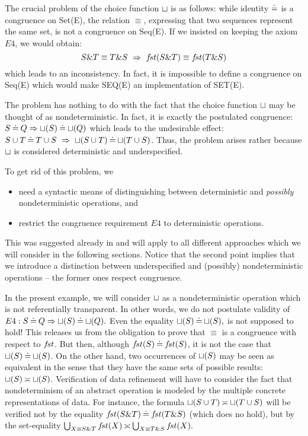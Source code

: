 The crucial problem of the choice function $ \sqcup $ is as follows: while identity $\mathbin{\doteq}$ is a congruence on Set(E), the relation $\equiv$, expressing that two sequences represent the same set, is not a congruence on Seq(E). If we insisted on keeping the axiom $E4$, we would obtain:
\begin{equation}\label{problem}
S\& T\equiv T\& S\ \mathrel\Rightarrow\ f\!st(S\& T)\equiv f\!st(T\& S) \end{equation}
which leads to an inconsistency. In fact, it is impossible to define a congruence on Seq(E) which would make
SEQ(E) an implementation of SET(E).

The problem has nothing to do with the fact that the choice function $\sqcup$ may be thought of as nondeterministic.
In fact, it is exactly the postulated congruence: $S\mathbin{\doteq} Q\mathrel\Rightarrow \sqcup(S)\mathbin{\doteq}\sqcup(Q)$
which leads to the undesirable
effect: \( S\cup T\mathbin{\doteq} T\cup S\ \mathrel\Rightarrow\ \sqcup(S\cup T)\mathbin{\doteq}\sqcup(T\cup S)\). Thus, the problem
arises rather because $\sqcup$ is considered deterministic and underspecified. %

To get rid of this problem, we
\begin{itemize}\MyLPar
\item need a syntactic means of distinguishing between deterministic and {\em possibly} nondeterministic operations, and \item restrict the congruence requirement $E4$ to deterministic operations. \end{itemize}
This was suggested already in \cite{QG} and will apply to all different approaches which we will consider in the following sections. Notice that the second
point implies that we introduce a distinction between underspecified and (possibly) nondeterministic operations -- the former ones respect congruence. 

In the present example, we will consider $\sqcup$ as a nondeterministic operation which is not referentially transparent. In other words, we do not postulate validity of $E4: S\mathbin{\doteq} Q\mathrel\Rightarrow \sqcup(S)\mathbin{\doteq}\sqcup(Q).$ Even the equality $\sqcup(S)\mathbin{\doteq}\sqcup(S),$ is not supposed to hold!
This releases us from the obligation to prove that $\equiv$ is a congruence with
respect to $f\!st$.
But then, although $f\!st(S)\mathbin{\doteq} f\!st(S)$, it is not the case that $\sqcup(S)\mathbin{\doteq}
\sqcup(S)$. On the other hand, two occurrences of $\sqcup(S)$ may be seen as equivalent
in the sense that they have the same sets of possible results: $\sqcup(S)\mathbin{\asymp}\sqcup(S).$
Verification of data refinement will have to consider the fact that nondeterminism of an abstract operation is modeled by the multiple concrete representations of data. For instance, the formula $\sqcup(S\cup T)\mathbin{\asymp} \sqcup(T\cup S)$ will be verified not by the equality $f\!st(S\&T)\mathbin{\doteq} f\!st(T\&S)$ (which does no hold), but by the set-equality
$\bigcup_{X\equiv S\& T}f\!st(X) \mathbin{\asymp} \bigcup_{X\equiv T\& S}f\!st(X).$ 

